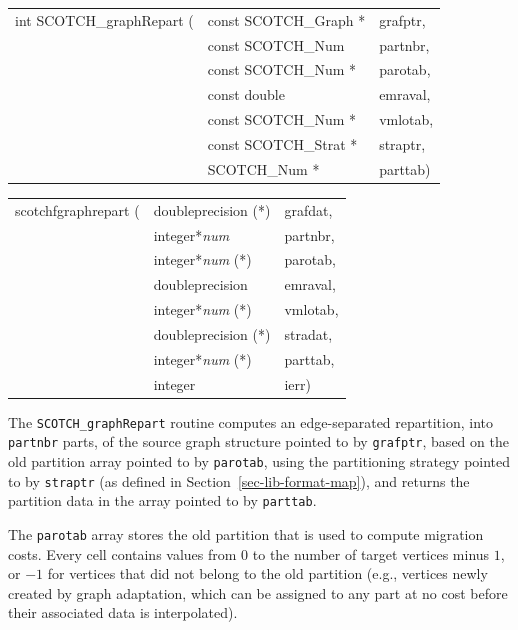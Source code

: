 \begin{itemize}
\progsyn

{\tt\begin{tabular}{l@{}ll}
int SCOTCH\_graphRepart ( & const SCOTCH\_Graph * & grafptr, \\
                          & const SCOTCH\_Num     & partnbr, \\
                          & const SCOTCH\_Num *   & parotab, \\
                          & const double          & emraval, \\
                          & const SCOTCH\_Num *   & vmlotab, \\
                          & const SCOTCH\_Strat * & straptr, \\
                          & SCOTCH\_Num *         & parttab)
\end{tabular}}

{\tt\begin{tabular}{l@{}ll}
scotchfgraphrepart ( & doubleprecision (*)   & grafdat, \\
                     & integer*{\it num}     & partnbr, \\
                     & integer*{\it num} (*) & parotab, \\
                     & doubleprecision       & emraval, \\
                     & integer*{\it num} (*) & vmlotab, \\
                     & doubleprecision (*)   & stradat, \\
                     & integer*{\it num} (*) & parttab, \\
                     & integer               & ierr)
\end{tabular}}

\progdes

The {\tt SCOTCH\_graphRepart} routine computes an edge-separated
repartition, into {\tt partnbr} parts, of the source graph structure
pointed to by {\tt grafptr}, based on the old partition array pointed
to by {\tt parotab}, using the partitioning strategy pointed to by
{\tt straptr} (as defined in Section~\ref{sec-lib-format-map}), and
returns the partition data in the array pointed to by {\tt parttab}.

The {\tt parotab} array stores the old partition that is used to
compute migration costs. Every cell contains values from $0$ to the
number of target vertices minus $1$, or $-1$ for vertices that did not
belong to the old partition (e.g., vertices newly created by graph
adaptation, which can be assigned to any part at no cost before
their associated data is interpolated).


\end{itemize}
